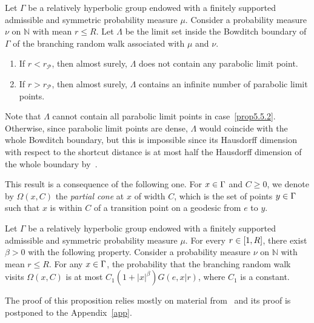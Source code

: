 \documentclass[10pt]{amsart}
\theoremstyle{definition}\newtheorem{defi}[theo]{Definition}\newtheorem{rema}[theo]{Remark}\newtheorem{exam}[theo]{Example}\newtheorem{exem}[theo]{Example}\newtheorem{nota}[theo]{Notation}
\newcommand\bbN{\mathbb{N}}
\newcommand{\clP}{\mathcal{P}}
\let\oldin\in
\renewcommand{\in}{\mathchoice{\oldin}{\oldin}{\,\oldin\,}{\,\oldin\,}}
\begin{document}
\begin{prop}\label{propparaboliclimitset}
Let $\Gamma$ be a relatively hyperbolic group endowed with a finitely supported admissible and symmetric probability measure $\mu$. Consider a probability measure $\nu$ on $\bbN$ with mean $r\leq R$. Let $\Lambda$ be the limit set inside the Bowditch boundary of $\Gamma$ of the branching random walk associated with $\mu$ and $\nu$.
\begin{enumerate}
\item\label{prop5.5.1} If $r<r_\clP$, then almost surely, $\Lambda$ does not contain any parabolic limit point.
\item\label{prop5.5.2} If $r>r_\clP$, then almost surely, $\Lambda$ contains an infinite number of parabolic limit points.
\end{enumerate}
\end{prop}

Note that $\Lambda$ cannot contain all parabolic limit points in case~\eqref{prop5.5.2}. Otherwise, since parabolic limit points are dense, $\Lambda$ would coincide with the whole Bowditch boundary, but this is impossible since its Hausdorff dimension with respect to the shortcut distance is at most half the Hausdorff dimension of the whole boundary by~\cite[Theorem~1.1, Theorem~1.2]{DWY}.

This result is a consequence of the following one. For $x\in \Gamma$ and $C\geq0$, we denote by $\Omega(x,C)$ the \emph{partial cone} at $x$ of width $C$, which is the set of points $y\in \Gamma$ such that $x$ is within $C$ of a transition point on a geodesic from $e$ to $y$.

\begin{prop}\label{proppartialcone}
Let $\Gamma$ be a relatively hyperbolic group endowed with a finitely supported admissible and symmetric probability measure $\mu$. For every $r\in [1,R]$, there exist $\beta>0$ with the following property. Consider a probability measure $\nu$ on $\bbN$ with mean $r\leq R$. For any $x\in \Gamma$, the probability that the branching random walk visits $\Omega(x,C)$ is at most $C_1(1+|x|^\beta)G(e,x|r)$, where $C_1$ is a constant.
\end{prop}

The proof of this proposition relies mostly on material from~\cite{DWY} and its proof is postponed to the Appendix~\ref{app}.
\end{document}
